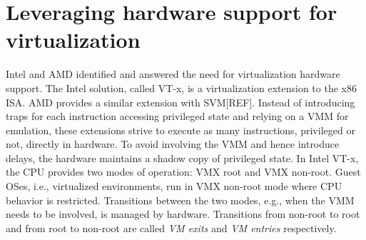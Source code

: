 \documentclass[letterpaper,twocolumn,10pt]{article}
\begin{document}
\section{Leveraging hardware support for virtualization}

Intel and AMD identified and answered the need for virtualization hardware support.
The Intel solution, called VT-x, is a virtualization extension to the x86 ISA.
AMD provides a similar extension with SVM[REF].
Instead of introducing traps for each instruction accessing privileged state and relying on a VMM for emulation, these extensions strive to execute as many instructions, privileged or not, directly in hardware.
To avoid involving the VMM and hence introduce delays, the hardware maintains a shadow copy of privileged state.
In Intel VT-x, the CPU provides two modes of operation: VMX root and VMX non-root.
Guest OSes, i.e., virtualized environments, run in VMX non-root mode where CPU behavior is restricted.
Transitions between the two modes, e.g., when the VMM needs to be involved, is managed by hardware.
Transitions from non-root to root and from root to non-root are called \emph{VM exits} and \emph{VM entries} respectively. \\
\end{document}
